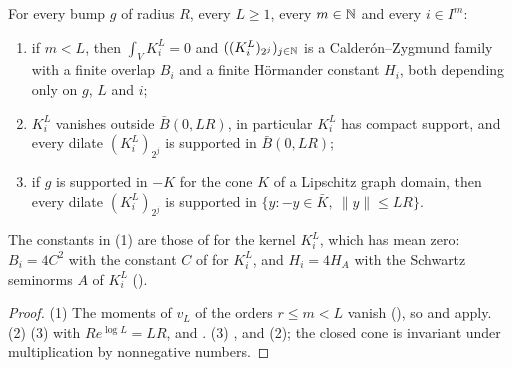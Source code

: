 \begin{theorem}
\label{thm:bump-higher-kernels-cz}
\leanok
{}
For every bump $g$ of radius $R$, every $L \geq 1$, every $m \in \mathbb{N}$ and every $i \in I^m$:
\begin{enumerate}
  \item if $m < L$, then $\int_V K^L_i = 0$ and $((K^L_i)_{2^j})_{j \in \mathbb{N}}$ is a
    Calder\'on--Zygmund family with a finite overlap $B_i$ and a finite H\"ormander constant
    $H_i$, both depending only on $g$, $L$ and $i$;
  \item $K^L_i$ vanishes outside $\bar B(0, L R)$, in particular $K^L_i$ has compact support, and
    every dilate $(K^L_i)_{2^j}$ is supported in $\bar B(0, L R)$;
  \item if $g$ is supported in $-K$ for the cone $K$ of a Lipschitz graph domain, then every
    dilate $(K^L_i)_{2^j}$ is supported in $\{y : -y \in \bar K, \ \|y\| \leq L R\}$.
\end{enumerate}
\end{theorem}

The constants in (1) are those of  for the kernel $K^L_i$, which
has mean zero: $B_i = 4 C^2$ with the constant $C$ of  for $K^L_i$,
and $H_i = 4 H_A$ with the Schwartz seminorms $A$ of $K^L_i$ ().

\begin{proof}
\leanok
(1) The moments of $v_L$ of the orders $r \leq m < L$ vanish (),
so  and  apply.
(2)  (3) with $R e^{\log L} = L R$, and
. (3) ,
 and (2); the closed cone is invariant under multiplication by
nonnegative numbers.
\end{proof}


